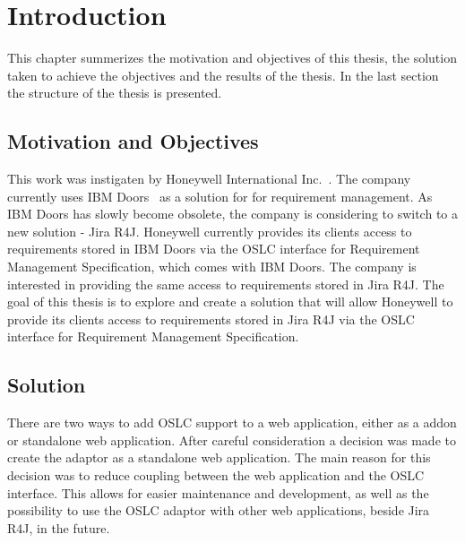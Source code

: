 
% 

\chapter{Introduction}
This chapter summerizes the motivation and objectives of this thesis, the solution taken to achieve the objectives and the results of the thesis. In the last section the structure of the thesis is presented.

\section{Motivation and Objectives}
This work was instigaten by Honeywell International Inc. \cite{honeywell}. The company currently uses IBM Doors \cite{ibm_doors} as a solution for for requirement management. As IBM Doors has slowly become obsolete, the company is considering to switch to a new solution - Jira R4J. Honeywell currently provides its clients access to requirements stored in IBM Doors via the OSLC interface for Requirement Management Specification, which comes with IBM Doors. The company is interested in providing the same access to requirements stored in Jira R4J. The goal of this thesis is to explore and create a solution that will allow Honeywell to provide its clients access to requirements stored in Jira R4J via the OSLC interface for Requirement Management Specification.

\section{Solution}
There are two ways to add OSLC support to a web application, either as a addon or standalone web application. After careful consideration a decision was made to create the adaptor as a standalone web application. The main reason for this decision was to reduce coupling between the web application and the OSLC interface. This allows for easier maintenance and development, as well as the possibility to use the OSLC adaptor with other web applications, beside Jira R4J, in the future. 

